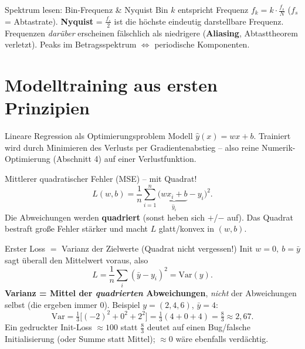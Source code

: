 \documentclass[a4paper,11pt]{article}
\begin{document}
\begin{falle}{Spektrum lesen: Bin-Frequenz \& Nyquist}
Bin $k$ entspricht Frequenz $f_k=k\cdot\frac{f_s}{N}$ ($f_s$ = Abtastrate). \textbf{Nyquist} =
$\frac{f_s}{2}$ ist die höchste eindeutig darstellbare Frequenz. Frequenzen \emph{darüber}
erscheinen fälschlich als niedrigere (\textbf{Aliasing}, Abtasttheorem verletzt). Peaks im
Betragsspektrum $\Leftrightarrow$ periodische Komponenten.
\end{falle}

\section{Modelltraining aus ersten Prinzipien}

\begin{intu}{Lineare Regression als Optimierungsproblem}
Modell $\hat y(x)=w x+b$. Trainiert wird durch Minimieren des Verlusts per Gradientenabstieg --
also reine Numerik-Optimierung (Abschnitt 4) auf einer Verlustfunktion.
\end{intu}

\begin{defi}{Mittlerer quadratischer Fehler (MSE) -- mit Quadrat!}
\[
  L(w,b)=\frac1n\sum_{i=1}^n\bigl(\underbrace{w x_i+b}_{\hat y_i}-y_i\bigr)^2 .
\]
Die Abweichungen werden \textbf{quadriert} (sonst heben sich $+$/$-$ auf). Das Quadrat bestraft
große Fehler stärker und macht $L$ glatt/konvex in $(w,b)$.
\end{defi}

\begin{falle}{Erster Loss $=$ Varianz der Zielwerte (Quadrat nicht vergessen!)}
Init $w=0,\ b=\bar y$ sagt überall den Mittelwert voraus, also
\[
  L=\frac1n\sum_i(\bar y-y_i)^2=\mathrm{Var}(y).
\]
\textbf{Varianz = Mittel der \emph{quadrierten} Abweichungen}, \emph{nicht} der Abweichungen selbst
(die ergeben immer $0$). Beispiel $y=(2,4,6)$, $\bar y=4$:
\[
  \mathrm{Var}=\tfrac13\bigl[(-2)^2+0^2+2^2\bigr]=\tfrac13(4+0+4)=\tfrac83\approx2{,}67.
\]
Ein gedruckter Init-Loss $\approx100$ statt $\tfrac83$ deutet auf einen Bug/falsche Initialisierung
(oder Summe statt Mittel); $\approx0$ wäre ebenfalls verdächtig.
\end{falle}
\end{document}
